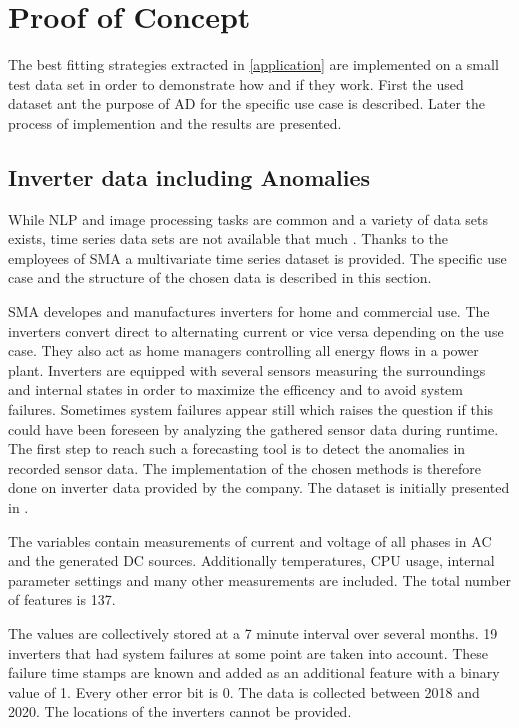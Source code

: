 \section{Proof of Concept}\label{implementation}
The best fitting strategies extracted in \autoref{application} are implemented on a small test data set in order to demonstrate how and if they work. First the used dataset ant the purpose of AD for the specific use case is described. Later the process of implemention and the results are presented.
\subsection{Inverter data including Anomalies}
While NLP and image processing tasks are common and a variety of data sets exists, time series data sets are not available that much \cite{ma_survey_2023}. Thanks to the employees of SMA a multivariate time series dataset is provided. The specific use case and the structure of the chosen data is described in this section.

SMA developes and manufactures inverters for home and commercial use. The inverters convert direct to alternating current or vice versa depending on the use case. They also act as home managers controlling all energy flows in a power plant. Inverters are equipped with several sensors measuring the surroundings and internal states in order to maximize the efficency and to avoid system failures. Sometimes system failures appear still which raises the question if this could have been foreseen by analyzing the gathered sensor data during runtime. The first step to reach such a forecasting tool is to detect the anomalies in recorded sensor data. The implementation of the chosen methods is therefore done on inverter data provided by the company. The dataset is initially presented in \cite{nivarthi_towards_2023}.

The variables contain measurements of current and voltage of all phases in AC and the generated DC sources. Additionally temperatures, CPU usage, internal parameter settings and many other measurements are included. The total number of features is 137.

The values are collectively stored at a 7 minute interval over several months. 19 inverters that had system failures at some point are taken into account. These failure time stamps are known and added as an additional feature with a binary value of 1. Every other error bit is 0. The data is collected between 2018 and 2020. The locations of the inverters cannot be provided.

